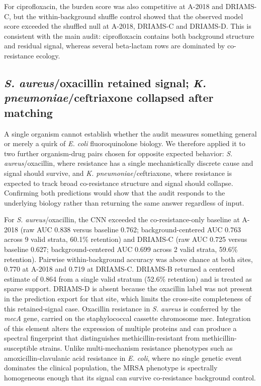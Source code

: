 \documentclass[11pt]{article}
\begin{document}
For ciprofloxacin, the burden score was also competitive at A-2018 and DRIAMS-C, but the within-background shuffle control showed that the observed model score exceeded the shuffled null at A-2018, DRIAMS-C and DRIAMS-D. This is consistent with the main audit: ciprofloxacin contains both background structure and residual signal, whereas several beta-lactam rows are dominated by co-resistance ecology.

\subsection*{\textit{S. aureus}/oxacillin retained signal; \textit{K. pneumoniae}/ceftriaxone collapsed after matching}

A single organism cannot establish whether the audit measures something general or merely a quirk of \textit{E. coli} fluoroquinolone biology. We therefore applied it to two further organism-drug pairs chosen for opposite expected behavior: \textit{S. aureus}/oxacillin, where resistance has a single mechanistically discrete cause and signal should survive, and \textit{K. pneumoniae}/ceftriaxone, where resistance is expected to track broad co-resistance structure and signal should collapse. Confirming both predictions would show that the audit responds to the underlying biology rather than returning the same answer regardless of input.

For \textit{S. aureus}/oxacillin, the CNN exceeded the co-resistance-only baseline at A-2018 (raw AUC 0.838 versus baseline 0.762; background-centered AUC 0.763 across 9 valid strata, 60.1\% retention) and DRIAMS-C (raw AUC 0.725 versus baseline 0.627; background-centered AUC 0.699 across 2 valid strata, 59.6\% retention). Pairwise within-background accuracy was above chance at both sites, 0.770 at A-2018 and 0.719 at DRIAMS-C. DRIAMS-B returned a centered estimate of 0.864 from a single valid stratum (52.6\% retention) and is treated as sparse support. DRIAMS-D is absent because the oxacillin label was not present in the prediction export for that site, which limits the cross-site completeness of this retained-signal case. Oxacillin resistance in \textit{S. aureus} is conferred by the \textit{mecA} gene, carried on the staphylococcal cassette chromosome mec\cite{chambers1997mrsa}. Integration of this element alters the expression of multiple proteins and can produce a spectral fingerprint that distinguishes methicillin-resistant from methicillin-susceptible strains. Unlike multi-mechanism resistance phenotypes such as amoxicillin-clavulanic acid resistance in \textit{E. coli}, where no single genetic event dominates the clinical population, the MRSA phenotype is spectrally homogeneous enough that its signal can survive co-resistance background control.
\end{document}
